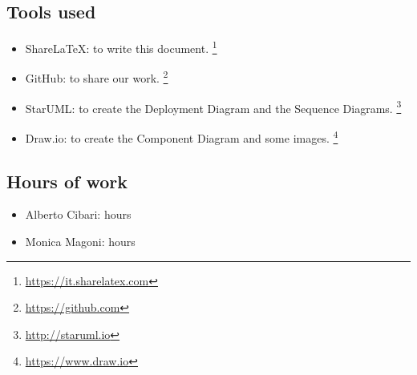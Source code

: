 \subsection*{Tools used}
    \begin{itemize}
    \item ShareLaTeX: to write this document. \footnote{\url{https://it.sharelatex.com}}
    \item GitHub: to share our work. 
    \footnote{\url{https://github.com}} 
    \item StarUML: to create the Deployment Diagram and the Sequence Diagrams. \footnote{\url{http://staruml.io}}
    \item Draw.io: to create the Component Diagram and some images.
    \footnote{\url{https://www.draw.io}}
    \end{itemize}

\subsection*{Hours of work}
    \begin{itemize}
    \item Alberto Cibari:  hours
    \item Monica Magoni:  hours
    \end{itemize}
    